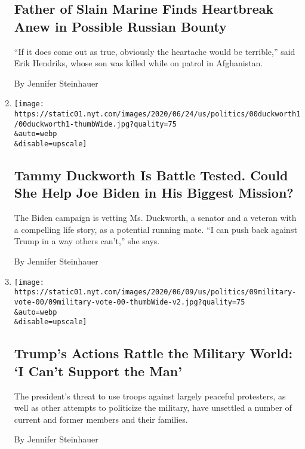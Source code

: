 \begin{enumerate}
  \hypertarget{father-of-slain-marine-finds-heartbreak-anew-in-possible-russian-bounty}{%
  \subsection{Father of Slain Marine Finds Heartbreak Anew in Possible
  Russian
  Bounty}\label{father-of-slain-marine-finds-heartbreak-anew-in-possible-russian-bounty}}

  ``If it does come out as true, obviously the heartache would be
  terrible,'' said Erik Hendriks, whose son was killed while on patrol
  in Afghanistan.

  By Jennifer Steinhauer
\item
  \href{/2020/06/25/us/politics/tammy-duckworth-vice-president-joe-biden.html}{}

  \texttt{[image: https://static01.nyt.com/images/2020/06/24/us/politics/00duckworth1/00duckworth1-thumbWide.jpg?quality=75\\\&auto=webp\\\&disable=upscale]}

  \hypertarget{tammy-duckworth-is-battle-tested-could-she-help-joe-biden-in-his-biggest-mission}{%
  \subsection{Tammy Duckworth Is Battle Tested. Could She Help Joe Biden
  in His Biggest
  Mission?}\label{tammy-duckworth-is-battle-tested-could-she-help-joe-biden-in-his-biggest-mission}}

  The Biden campaign is vetting Ms. Duckworth, a senator and a veteran
  with a compelling life story, as a potential running mate. ``I can
  push back against Trump in a way others can't,'' she says.

  By Jennifer Steinhauer
\item
  \href{/2020/06/12/us/politics/trump-polls-military-approval.html}{}

  \texttt{[image: https://static01.nyt.com/images/2020/06/09/us/politics/09military-vote-00/09military-vote-00-thumbWide-v2.jpg?quality=75\\\&auto=webp\\\&disable=upscale]}

  \hypertarget{trumps-actions-rattle-the-military-world-i-cant-support-the-man}{%
  \subsection{Trump's Actions Rattle the Military World: `I Can't
  Support the
  Man'}\label{trumps-actions-rattle-the-military-world-i-cant-support-the-man}}

  The president's threat to use troops against largely peaceful
  protesters, as well as other attempts to politicize the military, have
  unsettled a number of current and former members and their families.

  By Jennifer Steinhauer
\end{enumerate}

